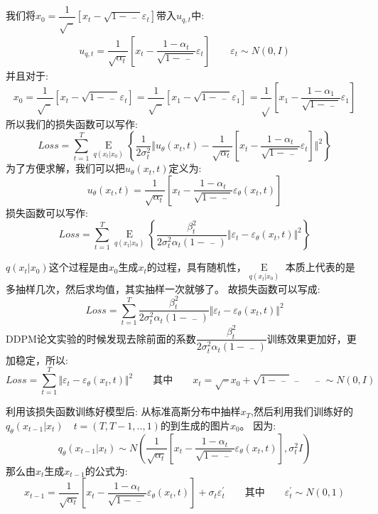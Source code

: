 \documentclass[withoutpreface,bwprint]{cumcmthesis} %
\begin{document}
	我们将$x_0=\dfrac{1}{\sqrt{\mathop{\alpha_{t}}\limits^{-}}}\left[ x_t -\sqrt{1-\mathop{\alpha_{t}}\limits^{-}}\varepsilon_t \right]$带入$u_{q,t}$中:
	\begin{align*}
		u_{q,t}=\dfrac{1}{\sqrt{\alpha_{t}}} \left[ x_t - \dfrac{1-\alpha_{t}}{\sqrt{ 1- \mathop{\alpha_{t}}\limits^{-}}}\varepsilon_{t}  \right] \quad \quad  \varepsilon_{t} \sim N(0,I)
	\end{align*}
	并且对于:
		$$
			x_0=\dfrac{1}{\sqrt{\mathop{\alpha_{t}}\limits^{-}}}\left[ x_t -\sqrt{1-\mathop{\alpha_{t}}\limits^{-}}\varepsilon_t \right]
			=\dfrac{1}{\sqrt{\mathop{\alpha_{1}}\limits^{-}}}\left[ x_1 -\sqrt{1-\mathop{\alpha_{1}}\limits^{-}}\varepsilon_1 \right]
			=\dfrac{1}{\sqrt{\mathop{\alpha_{1}}}}\left[ x_1 - \dfrac{1-\alpha_{1}}{\sqrt{ 1- \mathop{\alpha_{1}}\limits^{-}}} \varepsilon_1 \right]
		$$
	所以我们的损失函数可以写作:
	$$
		Loss=\sum_{t=1}^{T} \mathop{E}\limits_{ q(x_{t}|x_0) } \left\{
		\dfrac{1}{2 \sigma_t^2 } \Vert u_{\theta}(x_t,t)- \dfrac{1}{\sqrt{\alpha_{t}}} \left[ x_t - \dfrac{1-\alpha_{t}}{\sqrt{ 1- \mathop{\alpha_{t}}\limits^{-}}}\varepsilon_{t}  \right] \Vert^2
		\right\}
	$$
	为了方便求解，我们可以把$ u_{\theta}(x_t,t)$定义为:
	$$
		 u_{\theta}(x_t,t)= \dfrac{1}{\sqrt{\alpha_{t}}} \left[ x_t - \dfrac{1-\alpha_{t}}{\sqrt{ 1- \mathop{\alpha_{t}}\limits^{-}}}\varepsilon_{\theta}(x_t,t)  \right] 
	$$
	损失函数可以写作:
	$$
		Loss=\sum_{t=1}^{T} \mathop{E}\limits_{ q(x_{t}|x_0) } \left\{
				\dfrac{\beta_{t}^2}{ 2 \sigma_t^2 \alpha_{t}\left( 1- \mathop{\alpha_{t}}\limits^{-} \right)} \Vert \varepsilon_t - \varepsilon_{\theta}(x_t,t) \Vert^2
		\right\}
	$$
	
	${ q(x_{t}|x_0) }$这个过程是由$x_0$生成$x_t$的过程，具有随机性，$\mathop{E}\limits_{ q(x_{t}|x_0) }$ 本质上代表的是多抽样几次，然后求均值，其实抽样一次就够了。
	故损失函数可以写成:
	$$
		Loss=\sum_{t=1}^{T}  \dfrac{\beta_{t}^2}{ 2 \sigma_t^2 \alpha_{t}\left( 1- \mathop{\alpha_{t}}\limits^{-} \right)} \Vert \varepsilon_t - \varepsilon_{\theta}(x_t,t) \Vert^2
	$$
	DDPM论文实验的时候发现去除前面的系数$\dfrac{\beta_{t}^2}{ 2 \sigma_t^2 \alpha_{t}\left( 1- \mathop{\alpha_{t}}\limits^{-} \right)} $训练效果更加好，更加稳定，所以:
	$$
		Loss = \sum_{t=1}^{T} \Vert \varepsilon_t - \varepsilon_{\theta}(x_t,t) \Vert^2 \quad \quad \textbf{其中}\quad \quad x_t = \sqrt{\mathop{\alpha_{t}}\limits^{-}}x_0+ \sqrt{1-\mathop{\alpha_{t}}\limits^{-}} \mathop{\varepsilon_{t}}\limits^{-} \quad \mathop{\varepsilon_{t}}\limits^{-}  \sim N(0,I)  
	$$
	
	利用该损失函数训练好模型后:
	从标准高斯分布中抽样$x_T$,然后利用我们训练好的$ q_{\theta}(x_{t-1}|x_{t}) \quad t=\left(T,T-1,..,1\right)$的到生成的图片$x_0$。
	因为:
	$$
		q_{\theta}(x_{t-1}|x_{t}) \sim N(\dfrac{1}{\sqrt{\alpha_{t}}} \left[ x_t - \dfrac{1-\alpha_{t}}{\sqrt{ 1- \mathop{\alpha_{t}}\limits^{-}}}\varepsilon_{\theta}(x_t,t)  \right] ,\sigma_t^2I)
	$$
	那么由$x_t$生成$x_{t-1}$的公式为:
	$$
		x_{t-1}=\dfrac{1}{\sqrt{\alpha_{t}}} \left[ x_t - \dfrac{1-\alpha_{t}}{\sqrt{ 1- \mathop{\alpha_{t}}\limits^{-}}}\varepsilon_{\theta}(x_t,t)  \right]+ \sigma_t \varepsilon_{t}^{'}   \quad \quad \text{其中} \quad \quad \varepsilon_{t}^{'} \sim N(0,1)
	$$
	
\end{document}

